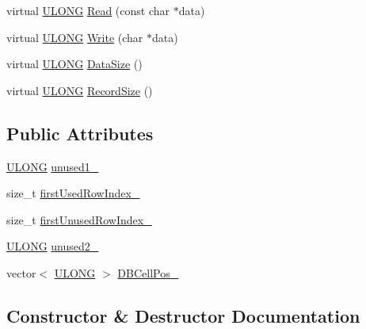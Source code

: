 \begin{DoxyCompactItemize}
\item 
virtual \hyperlink{_basic_excel_8hpp_abe09d1bea023be6a07cbadde8e955435}{U\+L\+O\+N\+G} \hyperlink{struct_y_excel_1_1_worksheet_1_1_index_ad35447cad444f1907273872ab7f01e4b}{Read} (const char $\ast$data)
\item 
virtual \hyperlink{_basic_excel_8hpp_abe09d1bea023be6a07cbadde8e955435}{U\+L\+O\+N\+G} \hyperlink{struct_y_excel_1_1_worksheet_1_1_index_ae5eeab9e3c418a0048bd0993e384b2bb}{Write} (char $\ast$data)
\item 
virtual \hyperlink{_basic_excel_8hpp_abe09d1bea023be6a07cbadde8e955435}{U\+L\+O\+N\+G} \hyperlink{struct_y_excel_1_1_worksheet_1_1_index_afef1acc0cc3f71d9ca9c327d3806c7c1}{Data\+Size} ()
\item 
virtual \hyperlink{_basic_excel_8hpp_abe09d1bea023be6a07cbadde8e955435}{U\+L\+O\+N\+G} \hyperlink{struct_y_excel_1_1_worksheet_1_1_index_ac4f3edeb0ea51e887e045066f09ddcb6}{Record\+Size} ()
\end{DoxyCompactItemize}
\subsection*{Public Attributes}
\begin{DoxyCompactItemize}
\item 
\hyperlink{_basic_excel_8hpp_abe09d1bea023be6a07cbadde8e955435}{U\+L\+O\+N\+G} \hyperlink{struct_y_excel_1_1_worksheet_1_1_index_aea12784b721dc465e67ff33dcda1dcf1}{unused1\+\_\+}
\item 
size\+\_\+t \hyperlink{struct_y_excel_1_1_worksheet_1_1_index_af9c6622fef186a8ac7ee11217e6adb7b}{first\+Used\+Row\+Index\+\_\+}
\item 
size\+\_\+t \hyperlink{struct_y_excel_1_1_worksheet_1_1_index_a941e6597fa0703bf19eb3e9563da14e8}{first\+Unused\+Row\+Index\+\_\+}
\item 
\hyperlink{_basic_excel_8hpp_abe09d1bea023be6a07cbadde8e955435}{U\+L\+O\+N\+G} \hyperlink{struct_y_excel_1_1_worksheet_1_1_index_a24316252150b80c27d4dbede7bf91724}{unused2\+\_\+}
\item 
vector$<$ \hyperlink{_basic_excel_8hpp_abe09d1bea023be6a07cbadde8e955435}{U\+L\+O\+N\+G} $>$ \hyperlink{struct_y_excel_1_1_worksheet_1_1_index_af30097b3a5f1483d480144b264d7d821}{D\+B\+Cell\+Pos\+\_\+}
\end{DoxyCompactItemize}


\subsection{Constructor \& Destructor Documentation}
\hypertarget{struct_y_excel_1_1_worksheet_1_1_index_a0a8e8ce237b8452969f4fdfe850dcb92}{}
